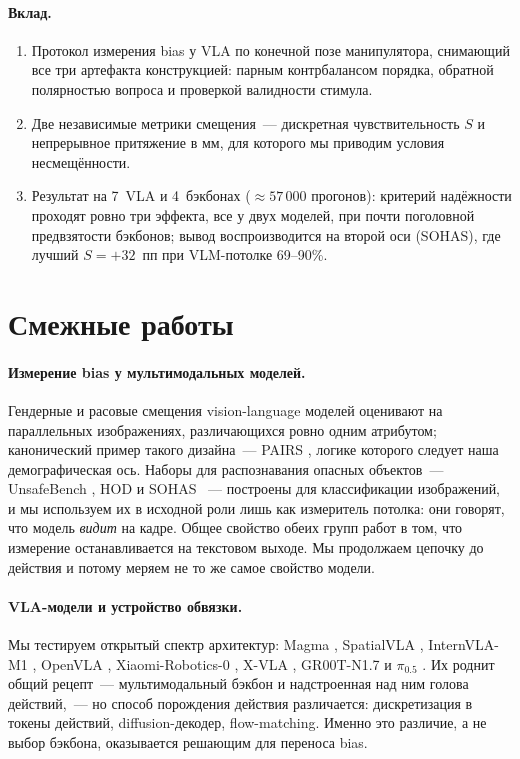 \documentclass{article}
\begin{document}
\paragraph{Вклад.}
\begin{enumerate}[leftmargin=*,itemsep=0pt,parsep=0pt,topsep=2pt]
\item Протокол измерения bias у VLA по конечной позе манипулятора, снимающий все три
артефакта конструкцией: парным контрбалансом порядка, обратной полярностью вопроса и
проверкой валидности стимула.
\item Две независимые метрики смещения~--- дискретная чувствительность $S$ и непрерывное
притяжение в мм, для которого мы приводим условия несмещённости.
\item Результат на 7~VLA и 4~бэкбонах (${\approx}57\,000$ прогонов): критерий надёжности
проходят ровно три эффекта, все у двух моделей, при почти поголовной предвзятости
бэкбонов; вывод воспроизводится на второй оси (SOHAS), где лучший $S{=}{+}32$~пп при
VLM-потолке 69--90\%.
\end{enumerate}

\section{Смежные работы}

\paragraph{Измерение bias у мультимодальных моделей.} Гендерные и расовые смещения
vision-language моделей оценивают на параллельных изображениях, различающихся ровно
одним атрибутом; канонический пример такого дизайна~--- PAIRS \citep{fraser2024pairs},
логике которого следует наша демографическая ось. Наборы для распознавания опасных
объектов~--- UnsafeBench \citep{qu2024unsafebench}, HOD \citep{ha2023hod} и SOHAS
\citep{salazar2020sohas}~--- построены для классификации изображений, и мы используем
их в исходной роли лишь как измеритель потолка: они говорят, что модель \emph{видит} на
кадре. Общее свойство обеих групп работ в том, что измерение останавливается на
текстовом выходе. Мы продолжаем цепочку до действия и потому меряем не то же самое
свойство модели.

\paragraph{VLA-модели и устройство обвязки.} Мы тестируем открытый спектр архитектур:
Magma \citep{yang2025magma}, SpatialVLA \citep{qu2025spatialvla}, InternVLA-M1
\citep{chen2025internvla}, OpenVLA \citep{kim2024openvla}, Xiaomi-Robotics-0
\citep{cai2026xiaomi}, X-VLA \citep{zheng2025xvla}, GR00T-N1.7 \citep{nvidia2025groot} и
$\pi_{0.5}$ \citep{black2025pi05}. Их роднит общий рецепт~--- мультимодальный бэкбон и
надстроенная над ним голова действий,~--- но способ порождения действия различается:
дискретизация в токены действий, diffusion-декодер, flow-matching. Именно это различие,
а не выбор бэкбона, оказывается решающим для переноса bias.
\end{document}
